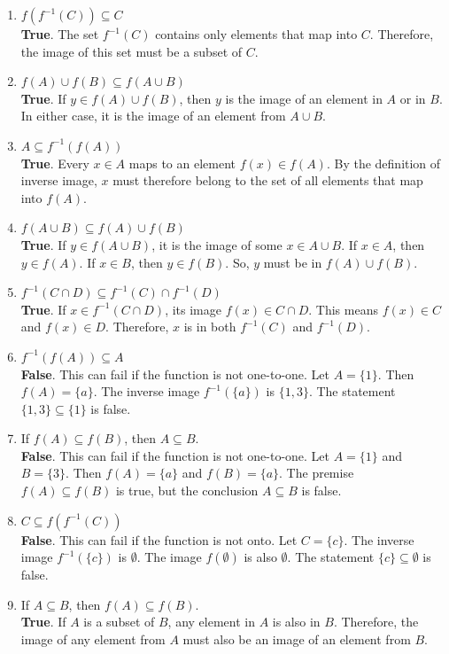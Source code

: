 \documentclass[10pt]{article}
\theoremstyle{definition}
\theoremstyle{plain}
\numberwithin{equation}{section}
\begin{document}
\begin{enumerate}
  \item $f\left(f^{-1}(C)\right) \subseteq C$ \\
  \textbf{True}. The set $f^{-1}(C)$ contains only elements that map into $C$. Therefore, the image of this set must be a subset of $C$.

  \item $f(A) \cup f(B) \subseteq f(A \cup B)$ \\
  \textbf{True}. If $y \in f(A) \cup f(B)$, then $y$ is the image of an element in $A$ or in $B$. In either case, it is the image of an element from $A \cup B$.

  \item $A \subseteq f^{-1}(f(A))$ \\
  \textbf{True}. Every $x \in A$ maps to an element $f(x) \in f(A)$. By the definition of inverse image, $x$ must therefore belong to the set of all elements that map into $f(A)$.

  \item $f(A \cup B) \subseteq f(A) \cup f(B)$ \\
  \textbf{True}. If $y \in f(A \cup B)$, it is the image of some $x \in A \cup B$. If $x \in A$, then $y \in f(A)$. If $x \in B$, then $y \in f(B)$. So, $y$ must be in $f(A) \cup f(B)$.

  \item $f^{-1}(C \cap D) \subseteq f^{-1}(C) \cap f^{-1}(D)$ \\
  \textbf{True}. If $x \in f^{-1}(C \cap D)$, its image $f(x) \in C \cap D$. This means $f(x) \in C$ and $f(x) \in D$. Therefore, $x$ is in both $f^{-1}(C)$ and $f^{-1}(D)$.

  \item $f^{-1}(f(A)) \subseteq A$ \\
  \textbf{False}. This can fail if the function is not one-to-one. Let $A=\{1\}$. Then $f(A)=\{a\}$. The inverse image $f^{-1}(\{a\})$ is $\{1, 3\}$. The statement $\{1, 3\} \subseteq \{1\}$ is false.

  \item If $f(A) \subseteq f(B)$, then $A \subseteq B$. \\
  \textbf{False}. This can fail if the function is not one-to-one. Let $A=\{1\}$ and $B=\{3\}$. Then $f(A)=\{a\}$ and $f(B)=\{a\}$. The premise $f(A) \subseteq f(B)$ is true, but the conclusion $A \subseteq B$ is false.

  \item $C \subseteq f\left(f^{-1}(C)\right)$ \\
  \textbf{False}. This can fail if the function is not onto. Let $C=\{c\}$. The inverse image $f^{-1}(\{c\})$ is $\emptyset$. The image $f(\emptyset)$ is also $\emptyset$. The statement $\{c\} \subseteq \emptyset$ is false.

  \item If $A \subseteq B$, then $f(A) \subseteq f(B)$. \\
  \textbf{True}. If $A$ is a subset of $B$, any element in $A$ is also in $B$. Therefore, the image of any element from $A$ must also be an image of an element from $B$.

\end{enumerate}
\end{document}
